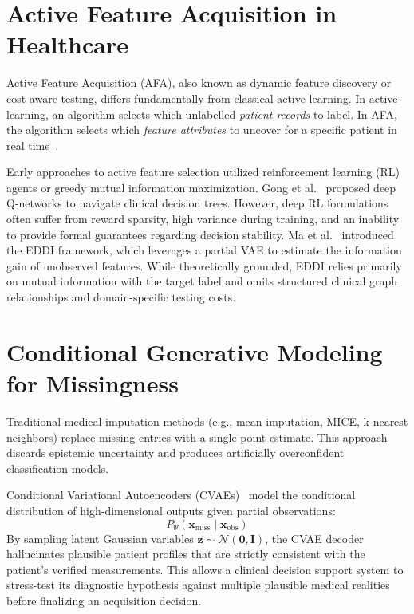 \documentclass[11pt,a4paper]{report}
\begin{document}
\section{Active Feature Acquisition in Healthcare}
Active Feature Acquisition (AFA), also known as dynamic feature discovery or cost-aware testing, differs fundamentally from classical active learning. In active learning, an algorithm selects which unlabelled \textit{patient records} to label. In AFA, the algorithm selects which \textit{feature attributes} to uncover for a specific patient in real time~\cite{ma2019eddi,shim2018joint}.

Early approaches to active feature selection utilized reinforcement learning (RL) agents or greedy mutual information maximization. Gong et al.~\cite{gong2021ice} proposed deep Q-networks to navigate clinical decision trees. However, deep RL formulations often suffer from reward sparsity, high variance during training, and an inability to provide formal guarantees regarding decision stability. Ma et al.~\cite{ma2019eddi} introduced the EDDI framework, which leverages a partial VAE to estimate the information gain of unobserved features. While theoretically grounded, EDDI relies primarily on mutual information with the target label and omits structured clinical graph relationships and domain-specific testing costs.

\section{Conditional Generative Modeling for Missingness}
Traditional medical imputation methods (e.g., mean imputation, MICE, k-nearest neighbors) replace missing entries with a single point estimate. This approach discards epistemic uncertainty and produces artificially overconfident classification models.

Conditional Variational Autoencoders (CVAEs)~\cite{kingma2013auto,sohn2015learning} model the conditional distribution of high-dimensional outputs given partial observations:
\begin{equation}
  P_\Psi(\mathbf{x}_{\text{miss}} \mid \mathbf{x}_{\text{obs}})
\end{equation}
By sampling latent Gaussian variables $\mathbf{z} \sim \mathcal{N}(\mathbf{0}, \mathbf{I})$, the CVAE decoder hallucinates plausible patient profiles that are strictly consistent with the patient's verified measurements. This allows a clinical decision support system to stress-test its diagnostic hypothesis against multiple plausible medical realities before finalizing an acquisition decision.
\end{document}
